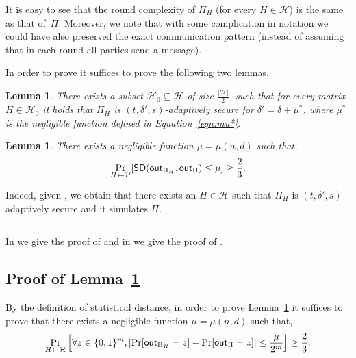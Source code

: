 \documentclass[11pt]{article}
\theoremstyle{plain}
\newtheorem{lemma}[theorem]{Lemma}
\theoremstyle{definition}
\numberwithin{equation}{section}
\newcommand{\qedsymb}{\hfill{\rule{2mm}{2mm}}}
\renewenvironment{proof}{\begin{trivlist} \item[\hspace{\labelsep}{\bf
\noindent Proof.\/}] }{\qedsymb\end{trivlist}}
\numberwithin{equation}{section} \newcommand{\aka} {also known as\ }
\newcommand{\abs}[1]{\left|#1\right|}
\newcommand{\Hc}{\mathcal H}
\newcommand{\1}{\mathbf{1}}
\newcommand{\SD}{\mathsf{SD}}
\theoremstyle{remark}
\begin{document}
\begin{proof}
It is easy to see that the round
complexity of $\Pi_H$ (for every $H\in\Hc$) is the same as that of~$\Pi$.  Moreover, we note that with some complication in notation we could have also preserved the exact communication pattern (instead of assuming that in each round all parties send a message).

In order to prove  it suffices to prove the following two lemmas.
\begin{lemma}\label{lemma:H_secure}
  There exists a subset $\Hc_0\subseteq\Hc$ of size $\frac{\abs{\Hc}}{2}$, such that for every matrix $H\in\Hc_0$ it holds that $\Pi_H$ is $(t,\delta',s)$-adaptively secure for $\delta'= \delta+\mu^*$, where $\mu^*$ is the negligible function defined in Equation~\eqref{eqn:mu*}.

\end{lemma}

\begin{lemma}\label{claim:simulation}
There exists a negligible function $\mu=\mu(n,d)$ such that,
$$
\Pr_{H\leftarrow \Hc}[\SD({\sf out}_{\Pi_H},{\sf out}_{\Pi})\leq\mu]\geq\frac{2}{3}.
$$
\end{lemma}

Indeed, given , we obtain that there
exists an $H\in\Hc$ such that $\Pi_H$ is $(t,\delta', s)$-adaptively secure and
it simulates $\Pi$.
\end{proof}

In  we give the proof of  and
in  we give the proof of .

\subsection{Proof of Lemma~\ref{claim:simulation}}\label{sec:claim_simulation}
  By the definition of statistical distance, in order to prove
  Lemma~\ref{claim:simulation} it suffices to prove that there exists a
  negligible function $\mu=\mu(n,d)$ such that,
$$
\Pr_{H\leftarrow \Hc}\left[\forall z\in\{0,1\}^m, \abs{\Pr[{\sf
      out}_{\Pi_H}=z]-\Pr[{\sf
      out}_{\Pi}=z]}\leq\frac{\mu}{2^m}\right]\geq\frac{2}{3}.
$$
\end{document}
